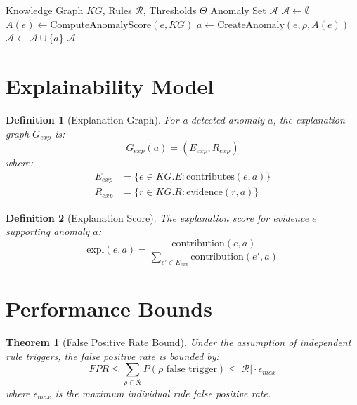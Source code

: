 \documentclass[11pt]{article}
\newtheorem{definition}{Definition}
\newtheorem{theorem}{Theorem}
\begin{document}
\begin{algorithm}[H]
\caption{Semantic Anomaly Detection}
\begin{algorithmic}[1]
\REQUIRE Knowledge Graph $KG$, Rules $\mathcal{R}$, Thresholds $\Theta$
\ENSURE Anomaly Set $\mathcal{A}$
\STATE $\mathcal{A} \leftarrow \emptyset$
    \STATE $A(e) \leftarrow \text{ComputeAnomalyScore}(e, KG)$
                \STATE $a \leftarrow \text{CreateAnomaly}(e, \rho, A(e))$
                \STATE $\mathcal{A} \leftarrow \mathcal{A} \cup \{a\}$
            \ENDIF
        \ENDFOR
    \ENDIF
\ENDFOR
\RETURN $\mathcal{A}$
\end{algorithmic}
\end{algorithm}

\section{Explainability Model}

\begin{definition}[Explanation Graph]
For a detected anomaly $a$, the explanation graph $G_{exp}$ is:
\begin{equation}
    G_{exp}(a) = (E_{exp}, R_{exp})
\end{equation}
where:
\begin{align}
    E_{exp} &= \{e \in KG.E : \text{contributes}(e, a)\} \\
    R_{exp} &= \{r \in KG.R : \text{evidence}(r, a)\}
\end{align}
\end{definition}

\begin{definition}[Explanation Score]
The explanation score for evidence $e$ supporting anomaly $a$:
\begin{equation}
    \text{expl}(e, a) = \frac{\text{contribution}(e, a)}{\sum_{e' \in E_{exp}} \text{contribution}(e', a)}
\end{equation}
\end{definition}

\section{Performance Bounds}

\begin{theorem}[False Positive Rate Bound]
Under the assumption of independent rule triggers, the false positive rate is bounded by:
\begin{equation}
    FPR \leq \sum_{\rho \in \mathcal{R}} P(\rho \text{ false trigger}) \leq |\mathcal{R}| \cdot \epsilon_{max}
\end{equation}
where $\epsilon_{max}$ is the maximum individual rule false positive rate.
\end{theorem}
\end{document}
